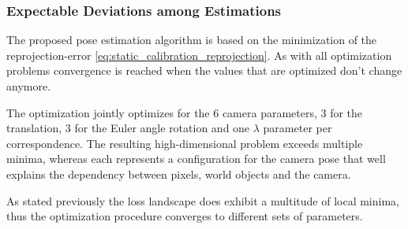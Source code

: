\subsubsection{Expectable Deviations among Estimations}
The proposed pose estimation algorithm is based on the minimization of the reprojection-error \autoref{eq:static_calibration_reprojection}.
As with all optimization problems convergence is reached when the values that are optimized don't change anymore.

The optimization jointly optimizes for the 6 camera parameters, 3 for the translation, 3 for the Euler angle rotation and one $\lambda$ parameter per correspondence.
The resulting high-dimensional problem exceeds multiple minima, whereas each represents a configuration for the camera pose that well explains the dependency between pixels, world objects and the camera. 

As stated previously the loss landscape does exhibit a multitude of local minima, thus the optimization procedure converges to different sets of parameters. 

